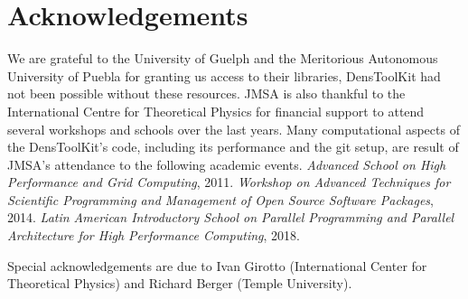 \documentclass[12pt]{book}
\newcommand{\DTK}{Dens\-Tool\-Kit}
\begin{document}
\newpage\thispagestyle{empty}
\phantom{asd}

\vspace{50mm}

\section*{Acknowledgements}

We are grateful to the University of Guelph and the Meritorious
Autonomous University of Puebla for granting us access to their libraries, \DTK{} 
had not been possible without these resources.
JMSA is also thankful to the International Centre for 
Theoretical Physics for financial support to attend several workshops and
schools over the last years. Many computational aspects of the \DTK's code, including its performance and the 
git setup, are result of JMSA's attendance to the following academic events.
\textit{Advanced School on High Performance 
and Grid Computing}, 2011. \textit{Workshop on Advanced Techniques for Scientific 
Programming and Management of Open Source Software Packages}, 2014.
\textit{Latin American Introductory School on Parallel Programming and
Parallel Architecture for High Performance Computing}, 2018.

Special acknowledgements are due to Ivan Girotto (International Center for
Theoretical Physics) and Richard Berger (Temple University).

\newpage\thispagestyle{empty}
\phantom{asdf}

\tableofcontents\label{toclbl}


\mainmatter





%
%








\lstset{language=bash%
,basicstyle=\footnotesize\ttfamily%
}










\appendix



\end{document}
